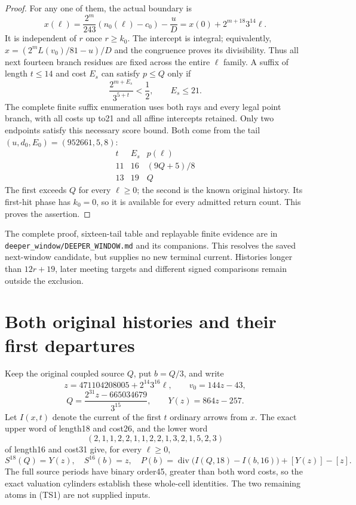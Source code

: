 \documentclass[11pt]{article}
\begin{document}
\begin{proof}
For any one of them, the actual boundary is
\[
 x(\ell)=\frac{2^m}{243}(n_0(\ell)-c_0)-\frac{u}{D}
        =x(0)+2^{m+18}3^{14}\ell.
\]
It is independent of $r$ once $r\ge k_0$. The intercept is integral;
equivalently, $x=(2^m L(v_0)/81-u)/D$ and the congruence proves its
divisibility. Thus all next fourteen branch residues are fixed across
the entire $\ell$ family. A suffix of length $t\le14$ and cost $E_s$
can satisfy $p\le Q$ only if
\[
 \frac{2^{m+E_s}}{3^{5+t}}<\frac12,\qquad E_s\le21.
\]
The complete finite suffix enumeration uses both rays and every legal
point branch, with all costs up to21 and all affine intercepts retained.
Only two endpoints satisfy this necessary score bound. Both come from
the tail $(u,d_0,E_0)=(952661,5,8)$:
\[
 \begin{array}{c|c|c}
 t&E_s&p(\ell)\\\hline
 11&16&(9Q+5)/8\\
 13&19&Q
 \end{array}
\]
The first exceeds $Q$ for every $\ell\ge0$; the second is the known
original history. Its first-hit phase has $k_0=0$, so it is available
for every admitted return count. This proves the assertion.
\end{proof}

The complete proof, sixteen-tail table and replayable finite evidence are
in \texttt{deeper\_window/DEEPER\_WINDOW.md} and its companions.
This resolves the saved next-window candidate, but supplies no new
terminal current. Histories longer than $12r+19$, later meeting targets
and different signed comparisons remain outside the exclusion.

\section{Both original histories and their first departures}

Keep the original coupled source $Q$, put $b=Q/3$, and write
\[
 z=471104208005+2^{14}3^{16}\ell,\qquad v_0=144z-43,
\]
\[
 Q=\frac{2^{31}z-665034679}{3^{15}},\qquad
 Y(z)=864z-257.
\]
Let $I(x,t)$ denote the current of the first $t$ ordinary arrows from $x$.
The exact upper word of length18 and cost26, and the lower word
\[
 (2,1,1,2,2,1,1,2,2,1,3,2,1,5,2,3)
\]
of length16 and cost31 give, for every $\ell\ge0$,
\[
 S^{18}(Q)=Y(z),\quad S^{16}(b)=z,\quad
 P(b)=\operatorname{div}\bigl(I(Q,18)-I(b,16)\bigr)+[Y(z)]-[z].
 \tag{TS1}
\]
The full source periods have binary order45, greater than both word
costs, so the exact valuation cylinders establish these whole-cell
identities. The two remaining atoms in (TS1) are not supplied inputs.
\end{document}
